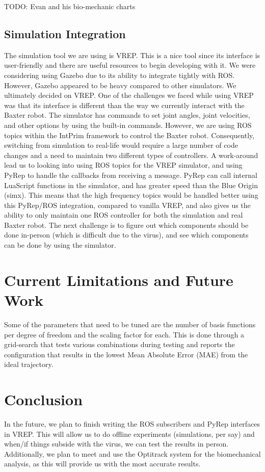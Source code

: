 \documentclass[letterpaper, 10 pt, conference]{ieeeconf}  %
\begin{document}
TODO: Evan and his bio-mechanic charts

\subsection{Simulation Integration} 
The simulation tool we are using is VREP. This is a nice tool since its interface is user-friendly and there are useful resources to begin developing with it. We were considering using Gazebo due to its ability to integrate tightly with ROS. However, Gazebo appeared to be heavy compared to other simulators. We ultimately decided on VREP. 
\newline
\indent
One of the challenges we faced while using VREP was that its interface is different than the way we currently interact with the Baxter robot. The simulator has commands to set joint angles, joint velocities, and other options by using the built-in commands. However, we are using ROS topics within the IntPrim framework to control the Baxter robot. Consequently, switching from simulation to real-life would require a large number of code changes and a need to maintain two different types of controllers. 
\newline
\indent A work-around lead us to looking into using ROS topics for the VREP simulator, and using PyRep to handle the callbacks from receiving a message. PyRep can call internal LuaScript functions in the simulator, and has greater speed than the Blue Origin (simx). This means that the high frequency topics would be handled better using this PyRep/ROS integration, compared to vanilla VREP, and also gives us the ability to only maintain one ROS controller for both the simulation and real Baxter robot. The next challenge is to figure out which components should be done in-person (which is difficult due to the virus), and see which components can be done by using the simulator. 


\section{Current Limitations and Future Work}
Some of the parameters that need to be tuned are the number of basis functions per degree of freedom and the scaling factor for each. This is done through a grid-search that tests various combinations during testing and reports the configuration that results in the lowest Mean Absolute Error (MAE) from the ideal trajectory.

\section{Conclusion}
In the future, we plan to finish writing the ROS subscribers and PyRep interfaces in VREP. This will allow us to do offline experiments (simulations, per say) and when/if things subside with the virus, we can test the results in person. Additionally, we plan to meet and use the Optitrack system for the biomechanical analysis, as this will provide us with the most accurate results.
\end{document}
